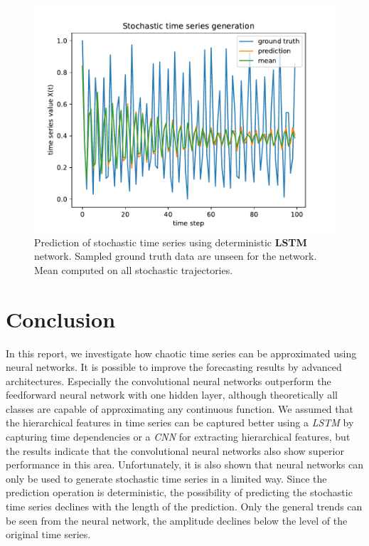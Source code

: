 \documentclass{article}
\begin{document}
\begin{figure}
  \centering
  \includegraphics[width=\textwidth]{figures/nn_limitation.pdf}
  \caption{Prediction of stochastic time series using deterministic
    \textbf{LSTM} network. Sampled ground truth data are unseen for the network.
    Mean computed on all stochastic trajectories.}
  \label{fig:nn_limitation}
\end{figure}

\section{Conclusion}

In this report, we investigate how chaotic time series can be approximated
using neural networks. It is possible to improve the forecasting results by
advanced architectures. Especially the convolutional neural networks
outperform the feedforward neural network with one hidden layer,
although theoretically all classes are capable of approximating any continuous
function. We assumed that the hierarchical features in time series can be
captured better using a \emph{LSTM} by capturing time dependencies or a
\emph{CNN} for extracting hierarchical features, but the results indicate that
the convolutional neural networks also show superior performance in this area.
Unfortunately, it is also shown that neural networks can only be used to
generate stochastic time series in a limited way. Since the prediction operation
is deterministic, the possibility of predicting the stochastic time series
declines with the length of the prediction. Only the general trends can be seen
from the neural network, the amplitude declines below the level of the
original time series.



\end{document}
